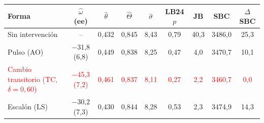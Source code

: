 \begin{tabular}{lcccccccc}
\toprule
Forma & $\hat\omega$ (ee) & $\hat\theta$ & $\hat\Theta$ & $\hat\sigma$ & LB24 $p$ & JB & SBC & $\Delta$SBC
\\ \midrule
Sin intervenci\'on & -- & 0{,}432 & 0{,}845 & 8{,}43 & 0{,}79 & 40{,}3 & 3486{,}0 & 25{,}3 \\
Pulso (AO) & \ensuremath{-}31{,}8 (6{,}8) & 0{,}449 & 0{,}838 & 8{,}25 & 0{,}47 & 4{,}0 & 3470{,}7 & 10{,}1 \\
\textcolor{red}{Cambio transitorio (TC, $\delta=0{,}60$)} & \textcolor{red}{\ensuremath{-}45{,}3 (7{,}2)} & \textcolor{red}{0{,}461} & \textcolor{red}{0{,}837} & \textcolor{red}{8{,}11} & \textcolor{red}{0{,}27} & \textcolor{red}{2{,}2} & \textcolor{red}{3460{,}7} & \textcolor{red}{0{,}0} \\
Escal\'on (LS) & \ensuremath{-}30{,}2 (7{,}3) & 0{,}430 & 0{,}844 & 8{,}28 & 0{,}53 & 2{,}3 & 3474{,}9 & 14{,}3 \\
\bottomrule
\end{tabular}
